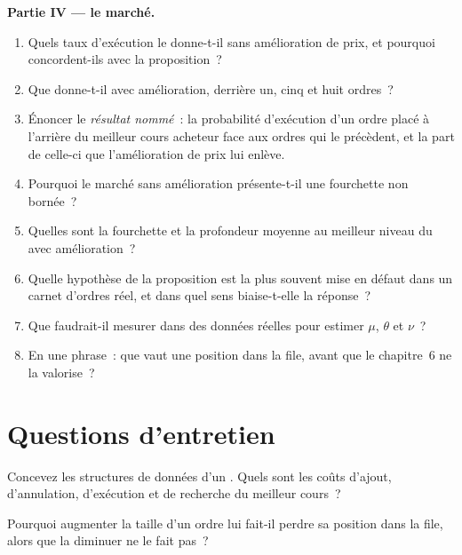 \begin{problem}
\medskip\noindent\textbf{Partie IV --- le marché.}
\begin{enumerate}[resume]
\item Quels taux d'exécution le  donne-t-il sans amélioration de prix, et pourquoi concordent-ils avec la proposition~?
\item Que donne-t-il avec amélioration, derrière un, cinq et huit ordres~?
\item Énoncer le \emph{résultat nommé}~: la probabilité d'exécution d'un ordre placé à l'arrière du meilleur cours acheteur face aux ordres qui le précèdent, et la part de celle-ci
que l'amélioration de prix lui enlève.
\item Pourquoi le marché sans amélioration présente-t-il une fourchette non bornée~?
\item Quelles sont la fourchette et la profondeur moyenne au meilleur niveau du  avec amélioration~?
\item Quelle hypothèse de la proposition est la plus souvent mise en défaut dans un carnet d'ordres réel, et dans quel sens biaise-t-elle la réponse~?
\item Que faudrait-il mesurer dans des données réelles pour estimer $\mu$, $\theta$ et $\nu$~?
\item En une phrase~: que vaut une position dans la file, avant que le chapitre~6 ne la valorise~?
\end{enumerate}
\end{problem}

\section{Questions d'entretien}

\begin{interviewq}\label{iq:mx:the-limit-order-book:1}
Concevez les structures de données d'un . Quels sont les coûts d'ajout, d'annulation, d'exécution et de recherche du meilleur cours~?
\end{interviewq}

\begin{interviewq}\label{iq:mx:the-limit-order-book:2}
Pourquoi augmenter la taille d'un ordre lui fait-il perdre sa position dans la file, alors que la diminuer ne le fait pas~?
\end{interviewq}

